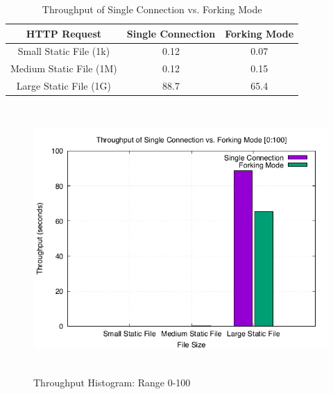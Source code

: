 \documentclass{article}
\begin{document}
        \begin{table}[H]
            \centering
            \begin{tabular}{c|c|c|}
            \hline
                {\bf HTTP Request} & {\bf Single Connection} & {\bf Forking Mode} \\
            \hline
                Small Static File (1k) & 0.12 & 0.07  \\
                Medium Static File (1M) & 0.12 & 0.15 \\
                Large Static File (1G) & 88.7 & 65.4 \\
            \hline 
            \end{tabular}
            \caption{Throughput of Single Connection vs. Forking Mode}
            \label{tab:throughput_table}
        \end{table}
        
        \begin{figure}[H]
            \centering
            \includegraphics[height=4in]{throughput1.png}
            \caption{Throughput Histogram: Range 0-100}
            \label{fig:throughput_graph}
        \end{figure}
        
\end{document}
